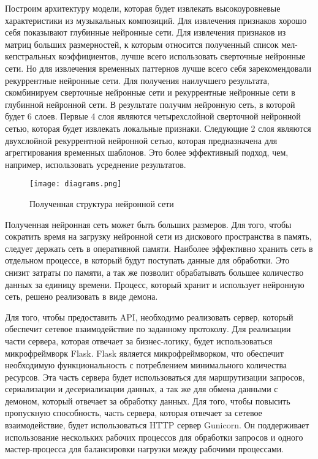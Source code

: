 Построим архитектуру модели, которая будет извлекать высокоуровневые характеристики из музыкальных композиций. Для извлечения признаков хорошо себя показывают глубинные нейронные сети. Для извлечения признаков из матриц больших размерностей, к которым относится полученный список мел-кепстральных коэффициентов, лучше всего использовать сверточные нейронные сети. Но для извлечения временных паттернов лучше всего себя зарекомендовали рекуррентные нейронные сети. Для получения наилучшего результата, скомбинируем сверточные нейронные сети и рекуррентные нейронные сети в глубинной нейронной сети. В результате получим нейронную сеть, в которой будет 6 слоев. Первые 4 слоя являются четырехслойной сверточной нейронной сетью, которая будет извлекать локальные признаки. Следующие 2 слоя являются двухслойной рекуррентной нейронной сетью, которая предназначена для агреггирования временных шаблонов. Это более эффективный подход, чем, например, использовать усреднение результатов.

\begin{figure}
\centering
	\texttt{[image: diagrams.png]}
	\caption{Полученная структура нейронной сети}
	\label{sec:design:dev:windows_mel}
\end{figure}

Полученная нейронная сеть может быть больших размеров. Для того, чтобы сократить время на загрузку нейронной сети из дискового пространства в память, следует держать сеть в оперативной памяти. Наиболее эффективно хранить сеть в отдельном процессе, в который будут поступать данные для обработки. Это снизит затраты по памяти, а так же позволит обрабатывать большее количество данных за единицу времени. Процесс, который хранит и использует нейронную сеть, решено реализовать в виде демона.

Для того, чтобы предоставить API, необходимо реализовать сервер, который обеспечит сетевое взаимодействие по заданному протоколу. Для реализации части сервера, которая отвечает за бизнес-логику, будет использоваться микрофреймворк Flask. Flask является микрофреймворком, что обеспечит необходимую функциональность с потреблением минимального количества ресурсов. Эта часть сервера будет использоваться для маршрутизации запросов, сериализации и десериализации данных, а так же для обмена данными с демоном, который отвечает за обработку данных. Для того, чтобы повысить пропускную способность, часть сервера, которая отвечает за сетевое взаимодействие, будет использоваться HTTP сервер Gunicorn. Он поддерживает использование нескольких рабочих процессов для обработки запросов и одного мастер-процесса для балансировки нагрузки между рабочими процессами.

